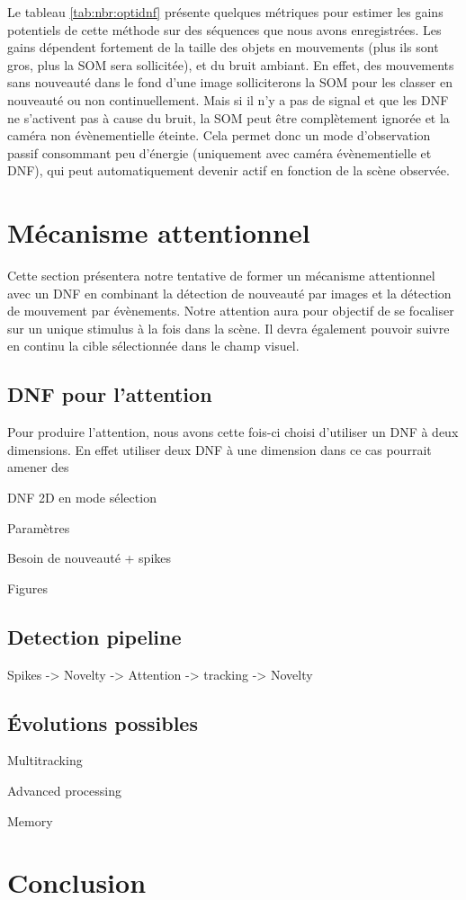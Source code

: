 	Le tableau \ref{tab:nbr:optidnf} présente quelques métriques pour estimer les gains potentiels de cette méthode sur des séquences que nous avons enregistrées. Les gains dépendent fortement de la taille des objets en mouvements (plus ils sont gros, plus la SOM sera sollicitée), et du bruit ambiant. En effet, des mouvements sans nouveauté dans le fond d'une image solliciterons la SOM pour les classer en nouveauté ou non continuellement. Mais si il n'y a pas de signal et que les DNF ne s'activent pas à cause du bruit, la SOM peut être complètement ignorée et la caméra non évènementielle éteinte. Cela permet donc un mode d'observation passif consommant peu d'énergie (uniquement avec caméra évènementielle et DNF), qui peut automatiquement devenir actif en fonction de la scène observée.

	\newpage

	\section{Mécanisme attentionnel}

	Cette section présentera notre tentative de former un mécanisme attentionnel avec un DNF en combinant la détection de nouveauté par images et la détection de mouvement par évènements. Notre attention aura pour objectif de se focaliser sur un unique stimulus à la fois dans la scène. Il devra également pouvoir suivre en continu la cible sélectionnée dans le champ visuel.

	\subsection{DNF pour l'attention}

	Pour produire l'attention, nous avons cette fois-ci choisi d'utiliser un DNF à deux dimensions. En effet utiliser deux DNF à une dimension dans ce cas pourrait amener des 

	DNF 2D en mode sélection

	Paramètres

	Besoin de nouveauté + spikes

	Figures 

	\subsection{Detection pipeline}

	Spikes -> Novelty -> Attention -> tracking -> Novelty

	\subsection{Évolutions possibles}

	Multitracking

	Advanced processing

	Memory

	\section{Conclusion}
		

